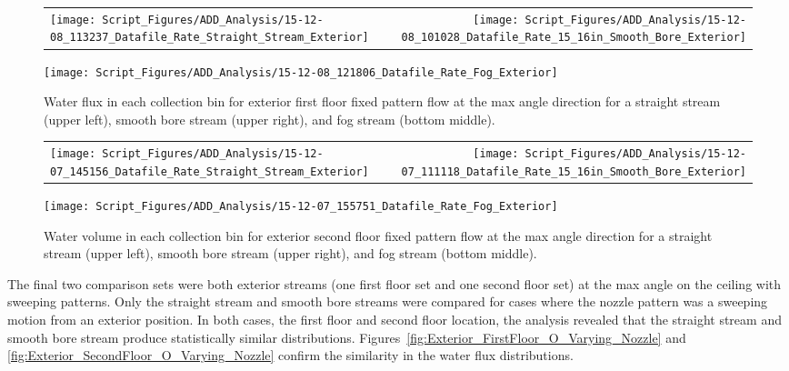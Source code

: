 \documentclass[12pt,oneside]{book}
\begin{document}
\begin{figure}[ht]
\begin{tabular*}{\textwidth}{lr}
\texttt{[image: Script\_Figures/ADD\_Analysis/15-12-08\_113237\_Datafile\_Rate\_Straight\_Stream\_Exterior]} &
\texttt{[image: Script\_Figures/ADD\_Analysis/15-12-08\_101028\_Datafile\_Rate\_15\_16in\_Smooth\_Bore\_Exterior]} \\
\end{tabular*}
\centering
\texttt{[image: Script\_Figures/ADD\_Analysis/15-12-08\_121806\_Datafile\_Rate\_Fog\_Exterior]}
\caption[Water Flux for Varying Exterior First Floor Fixed Pattern Hose Stream Types]{Water flux in each collection bin for exterior first floor fixed pattern flow at the max angle direction for a straight stream (upper left), smooth bore stream (upper right), and fog stream (bottom middle).}
\label{fig:Exterior_FirstFloor_Fixed_Varying_Nozzle}
\end{figure}

\begin{figure}[ht]
\begin{tabular*}{\textwidth}{lr}
\texttt{[image: Script\_Figures/ADD\_Analysis/15-12-07\_145156\_Datafile\_Rate\_Straight\_Stream\_Exterior]} &
\texttt{[image: Script\_Figures/ADD\_Analysis/15-12-07\_111118\_Datafile\_Rate\_15\_16in\_Smooth\_Bore\_Exterior]} \\
\end{tabular*}
\centering
\texttt{[image: Script\_Figures/ADD\_Analysis/15-12-07\_155751\_Datafile\_Rate\_Fog\_Exterior]}
\caption[Water Flux for Varying Exterior Second Floor Fixed Pattern Hose Stream Types]{Water volume in each collection bin for exterior second floor fixed pattern flow at the max angle direction for a straight stream (upper left), smooth bore stream (upper right), and fog stream (bottom middle).}
\label{fig:Exterior_SecondFloor_Fixed_Varying_Nozzle}
\end{figure}

\clearpage

The final two comparison sets were both exterior streams (one first floor set and one second floor set) at the max angle on the ceiling with sweeping patterns. Only the straight stream and smooth bore streams were compared for cases where the nozzle pattern was a sweeping motion from an exterior position. In both cases, the first floor and second floor location, the analysis revealed that the straight stream and smooth bore stream produce statistically similar distributions. Figures~\ref{fig:Exterior_FirstFloor_O_Varying_Nozzle} and \ref{fig:Exterior_SecondFloor_O_Varying_Nozzle} confirm the similarity in the water flux distributions.
\end{document}
